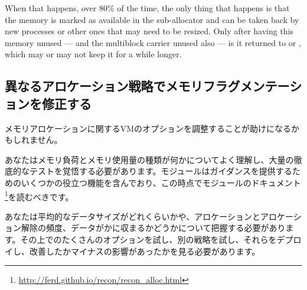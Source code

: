 When that happens, over 80\% of the time, the only thing that happens is that the memory is marked as available in the sub-allocator and can be taken back by new processes or other ones that may need to be resized. Only after having this memory unused — and the multiblock carrier unused also — is it returned to  or , which may or may not keep it for a while longer.

\subsection{異なるアロケーション戦略でメモリフラグメンテーションを修正する}

メモリアロケーションに関するVMのオプションを調整することが助けになるかもしれません。

あなたはメモリ負荷とメモリ使用量の種類が何かについてよく理解し、大量の徹底的なテストを覚悟する必要があります。モジュールはガイダンスを提供するためのいくつかの役立つ機能を含んでおり、この時点でモジュールのドキュメント\footnote{\href{http://ferd.github.io/recon/recon\_alloc.html}{http://ferd.github.io/recon/recon\_alloc.html}}を読むべきです。

あなたは平均的なデータサイズがどれくらいかや、アロケーションとアロケーション解除の頻度、データがかに収まるかどうかについて把握する必要があります。その上でのたくさんのオプションを試し、別の戦略を試し、それらをデプロイし、改善したかマイナスの影響があったかを見る必要があります。

